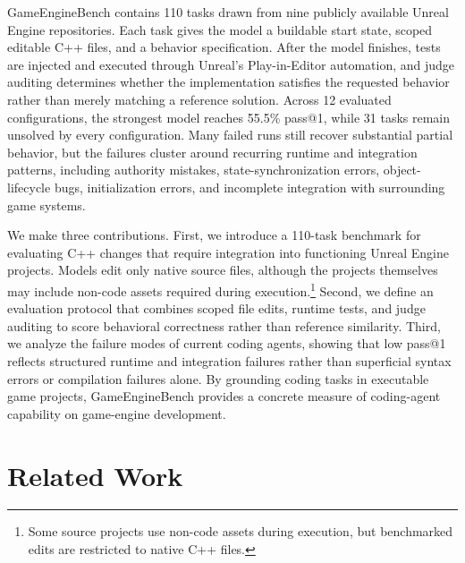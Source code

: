 \documentclass[11pt]{article}
\newcommand{\benchmarkname}{GameEngineBench\xspace}
\begin{document}
\benchmarkname contains 110 tasks drawn from nine publicly available Unreal Engine repositories. Each task gives the model a buildable start state, scoped editable C++ files, and a behavior specification. After the model finishes, tests are injected and executed through Unreal's Play-in-Editor automation, and judge auditing determines whether the implementation satisfies the requested behavior rather than merely matching a reference solution. Across 12 evaluated configurations, the strongest model reaches 55.5\% pass@1, while 31 tasks remain unsolved by every configuration. Many failed runs still recover substantial partial behavior, but the failures cluster around recurring runtime and integration patterns, including authority mistakes, state-synchronization errors, object-lifecycle bugs, initialization errors, and incomplete integration with surrounding game systems.

We make three contributions. First, we introduce a 110-task benchmark for evaluating C++ changes that require integration into functioning Unreal Engine projects. Models edit only native source files, although the projects themselves may include non-code assets required during execution.\footnote{Some source projects use non-code assets during execution, but benchmarked edits are restricted to native C++ files.} Second, we define an evaluation protocol that combines scoped file edits, runtime tests, and judge auditing to score behavioral correctness rather than reference similarity. Third, we analyze the failure modes of current coding agents, showing that low pass@1 reflects structured runtime and integration failures rather than superficial syntax errors or compilation failures alone. By grounding coding tasks in executable game projects, \benchmarkname provides a concrete measure of coding-agent capability on game-engine development.


\FloatBarrier
\section{Related Work}
\end{document}
